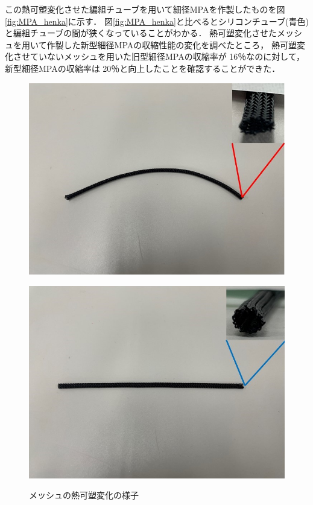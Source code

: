 この熱可塑変化させた編組チューブを用いて細径MPAを作製したものを図\ref{fig:MPA_henka}に示す．
図\ref{fig:MPA_henka}と比べるとシリコンチューブ(青色)と編組チューブの間が狭くなっていることがわかる．
熱可塑変化させたメッシュを用いて作製した新型細径MPAの収縮性能の変化を調べたところ，
熱可塑変化させていないメッシュを用いた旧型細径MPAの収縮率が 16％なのに対して，新型細径MPAの収縮率は 20％と向上したことを確認することができた．
%
\begin{figure}[!ht]
  \begin{minipage}{0.49\hsize}
    \centering  
    \includegraphics[scale=0.25]{image/messhu_hikaku_1.jpg}
    \label{fig:messhu_1}
  \end{minipage}
  \begin{minipage}{0.49\hsize}
    \centering
    \includegraphics[scale=0.25]{image/messhu_hikaku_2.jpg}
    \label{fig:messhu_2}
  \end{minipage}
  \caption{メッシュの熱可塑変化の様子}
  \label{fig:messhu_henka}
\end{figure}
